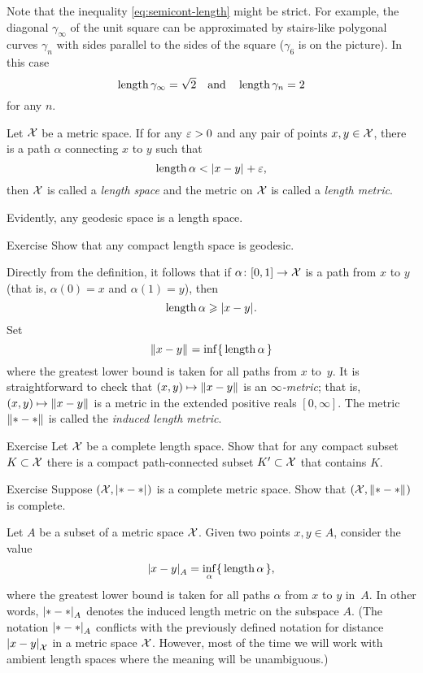 Note that the inequality \ref{eq:semicont-length} might be strict.
For example, the diagonal $\gamma_\infty$ of the unit square 
can be  approximated by stairs-like
polygonal curves $\gamma_n$
with sides parallel to the sides of the square ($\gamma_6$ is on the picture).
In this case
\[\mathop{\rm length}\nolimits\gamma_\infty=\sqrt{2}\quad
\text{and}\quad \mathop{\rm length}\nolimits\gamma_n=2\]
for any $n$.

Let $\mathcal{X}$ be a metric space.
If for any $\varepsilon>0$ and any pair of points $x,y\in\mathcal{X}$, there is a path $\alpha$ connecting $x$ to $y$ such that
\[\length\alpha< \dist{x}{y}{}+\eps,\]
then $\mathcal{X}$ is called a \emph{length space} and the metric on $\mathcal{X}$ is called a \emph{length metric}.\label{page:length metric}

Evidently, any geodesic space is a length space.

\begin{thm}{Exercise}\label{ex:compact-length}
Show that any compact length space is geodesic.
\end{thm}


Directly from the definition, it follows that if $\alpha\colon[0,1]\to\mathcal{X}$ is a path from $x$ to $y$ 
(that is, $\alpha(0)=x$ and $\alpha(1)=y$), then 
\[\length\alpha\ge \dist{x}{y}{}.\]
Set 
\[\yetdist{x}{y}{}=\inf\{\,\length\alpha\,\}\]
where the greatest lower bound is taken for all paths from $x$ to~$y$.
It is straightforward to check that $(x,y)\mapsto \yetdist{x}{y}{}$ is an \emph{$\infty$-metric};
that is, $(x,y)\mapsto \yetdist{x}{y}{}$ is a metric in the extended positive reals $[0,\infty]$. 
The metric $\yetdist{*}{*}{}$ is called the \emph{induced length metric}.

\begin{thm}{Exercise}\label{ex:compact+connceted}
Let $\mathcal{X}$ be a complete length space.
Show that for any compact subset $K\subset\mathcal{X}$
there is a compact path-connected subset $K'\subset\mathcal{X}$ that contains $K$.  
\end{thm}

\begin{thm}{Exercise}\label{ex:compact=>complete}
Suppose $(\spc{X},\dist{*}{*}{})$ is a complete metric space.
Show that $(\spc{X},\yetdist{*}{*}{})$ is complete.
\end{thm}

Let $A$ be a subset of a metric space $\mathcal{X}$.
Given two points $x,y\in A$,
consider the value
\[\dist{x}{y}{A}=\inf_{\alpha}\{\,\length\alpha\,\},\]
where the greatest lower bound is taken for all paths $\alpha$ from $x$ to $y$ in~$A$.
In other words, $\dist{*}{*}{A}$ denotes the induced length metric on the subspace $A$.
(The notation $\dist{*}{*}{A}$ conflicts with the previously defined notation for distance $\dist{x}{y}{\spc{X}}$ in a metric space $\mathcal{X}$.
However, most of the time we will work with ambient length spaces where the meaning will be unambiguous.)

